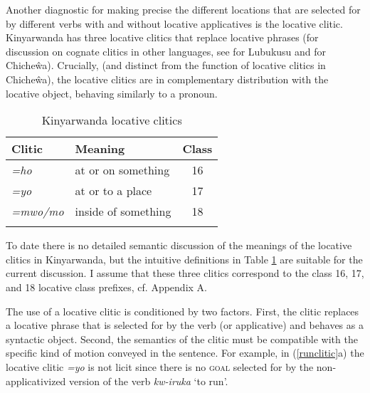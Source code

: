 \documentclass[output=paper]{langsci/langscibook}
\begin{document}
Another diagnostic for making precise the different locations that are selected for by different verbs with and without locative applicatives is the locative clitic. Kinyarwanda has three locative clitics that  replace locative phrases (for discussion on cognate clitics in other languages, see \citet{diercks:2011} for Lubukusu and \citet{simango:2012} for Chicheŵa). 	Crucially, (and distinct from the function of locative clitics in Chicheŵa), the locative clitics are in complementary distribution with the locative object, behaving similarly to a pronoun. 
%
\begin{table} 
      \begin{center}	
\caption{ {Kinyarwanda locative clitics}}
      \begin{tabular}[t]{llc}\\
\lsptoprule
	      Clitic			& Meaning				& Class \\
\midrule
			\emph{=ho}  & at or on something	& 16 \\
		      
		\emph{=yo} 	&  at or to a place 		& 17 \\

		\emph{=mwo/mo}  &  inside of something & 18\\
      
      \lspbottomrule
	\end{tabular}
\label{tab:clitic} 
			\end{center}
\end{table}
%
To date there is no detailed semantic discussion of the meanings of the locative clitics in Kinyarwanda, but the intuitive definitions in Table \ref{tab:clitic} are suitable for the current discussion. I assume that these three clitics correspond to the class 16, 17, and 18 locative class prefixes, cf. Appendix A.  

The use of a locative clitic is conditioned by two factors. First, the clitic replaces a locative phrase that is selected for by the verb (or applicative) and behaves as a syntactic object. Second, the semantics of the clitic must be compatible with the specific kind of motion conveyed in the sentence.  For example, in (\ref{runclitic}a) the locative clitic \emph{=yo} is not licit since there is no {\scshape goal}  selected for by the non-applicativized version of the verb \emph{kw-iruka} `to run'. 
\end{document}
